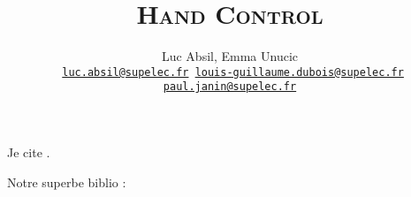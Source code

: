 \documentclass[fontsize=14pt, DIV=calc, a4paper]{scrartcl}
\title{\textsc{Hand Control}\\
\Huge \textbf{}}
\author{Luc Absil, Emma Unucic\\
\bigskip
{\tt \small
\href{mailto:luc.absil@supelec.fr}{luc.absil@supelec.fr}
\href{mailto:louis-guillaume.dubois@supelec.fr}{louis-guillaume.dubois@supelec.fr}
\href{mailto:paul.janin@supelec.fr}{paul.janin@supelec.fr}}}
\date{}
\begin{document}
\maketitle

Je cite \cite{blagues}.

Notre superbe biblio :
 
\end{document}
